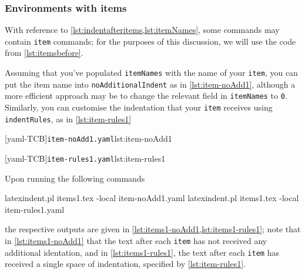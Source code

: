 \subsubsection{Environments with items}
	With reference to \vref{lst:indentafteritems,lst:itemNames}, some commands
	may contain \texttt{item} commands; for the purposes of this discussion,
	we will use the code from \vref{lst:itemsbefore}.

	Assuming that you've populated \texttt{itemNames} with the name of your
	\texttt{item}, you can put the item name into \texttt{noAdditionalIndent}
	as in \cref{lst:item-noAdd1}, although a more efficient approach may be
	to change the relevant field in \texttt{itemNames} to \texttt{0}. Similarly,
	you can customise the indentation that your \texttt{item} receives using
	\texttt{indentRules}, as in \cref{lst:item-rules1}

	\begin{minipage}{.45\textwidth}
		[yaml-TCB]{\texttt{item-noAdd1.yaml}}{lst:item-noAdd1}
	\end{minipage}%
	\hfill
	\begin{minipage}{.45\textwidth}
		[yaml-TCB]{\texttt{item-rules1.yaml}}{lst:item-rules1}
	\end{minipage}

	Upon running the following commands
	\begin{commandshell}
latexindent.pl items1.tex -local item-noAdd1.yaml  
latexindent.pl items1.tex -local item-rules1.yaml  
\end{commandshell}
	the respective outputs are given in \cref{lst:items1-noAdd1,lst:items1-rules1}; note that in \cref{lst:items1-noAdd1}
	that the text after each \texttt{item} has not received any additional identation, and in \cref{lst:items1-rules1},
	the text after each \texttt{item} has received a single space of indentation, specified by \cref{lst:item-rules1}.

	\begin{minipage}{.45\textwidth}
	\end{minipage}
	\hfill
	\begin{minipage}{.45\textwidth}
	\end{minipage}


